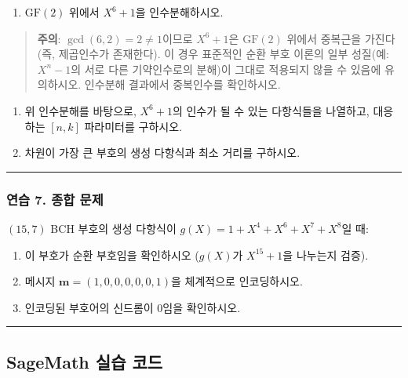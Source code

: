 \documentclass[
  oneside]{article}
\providecommand{\tightlist}{%
  \setlength{\itemsep}{0pt}\setlength{\parskip}{0pt}}
\begin{document}
\begin{enumerate}
\def\labelenumi{(\alph{enumi})}
\tightlist
\item
  \(\text{GF}(2)\) 위에서 \(X^6 + 1\)을 인수분해하시오.
\end{enumerate}

\begin{quote}
\textbf{주의}: \(\gcd(6, 2) = 2 \neq 1\)이므로 \(X^6 + 1\)은
\(\text{GF}(2)\) 위에서 중복근을 가진다 (즉, 제곱인수가 존재한다). 이
경우 표준적인 순환 부호 이론의 일부 성질(예: \(X^n - 1\)의 서로 다른
기약인수로의 분해)이 그대로 적용되지 않을 수 있음에 유의하시오. 인수분해
결과에서 중복인수를 확인하시오.
\end{quote}

\begin{enumerate}
\def\labelenumi{(\alph{enumi})}
\setcounter{enumi}{1}
\item
  위 인수분해를 바탕으로, \(X^6 + 1\)의 인수가 될 수 있는 다항식들을
  나열하고, 대응하는 \([n, k]\) 파라미터를 구하시오.
\item
  차원이 가장 큰 부호의 생성 다항식과 최소 거리를 구하시오.
\end{enumerate}

\begin{center}\rule{0.5\linewidth}{0.5pt}\end{center}

\subsubsection{연습 7. 종합
문제}\label{uxc5f0uxc2b5-7.-uxc885uxd569-uxbb38uxc81c}

\((15, 7)\) BCH 부호의 생성 다항식이
\(g(X) = 1 + X^4 + X^6 + X^7 + X^8\)일 때:

\begin{enumerate}
\def\labelenumi{(\alph{enumi})}
\item
  이 부호가 순환 부호임을 확인하시오 (\(g(X)\)가 \(X^{15} + 1\)을
  나누는지 검증).
\item
  메시지 \(\mathbf{m} = (1, 0, 0, 0, 0, 0, 1)\)을 체계적으로
  인코딩하시오.
\item
  인코딩된 부호어의 신드롬이 0임을 확인하시오.
\end{enumerate}

\begin{center}\rule{0.5\linewidth}{0.5pt}\end{center}

\subsection{SageMath 실습
코드}\label{sagemath-uxc2e4uxc2b5-uxcf54uxb4dc}
\end{document}
